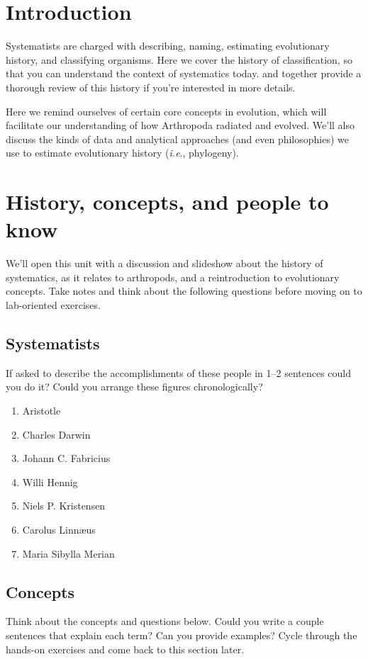 \section{Introduction}
Systematists are charged with describing, naming, estimating evolutionary history, and classifying organisms. Here we cover the history of classification, so that you can understand the context of systematics today. \cite{grimaldi2005evolution} and \cite{EngelKristensen2013} together provide a thorough review of this history if you're interested in more details.

Here we remind ourselves of certain core concepts in evolution, which will facilitate our understanding of how Arthropoda radiated and evolved. We'll also discuss the kinds of data and analytical approaches (and even philosophies) we use to estimate evolutionary history (\textit{i.e}., phylogeny).

\section{History, concepts, and people to know}
We'll open this unit with a discussion and slideshow about the history of systematics, as it relates to arthropods, and a reintroduction to evolutionary concepts. Take notes and think about the following questions before moving on to lab-oriented exercises.

\subsection{Systematists}
If asked to describe the accomplishments of these people in 1--2 sentences could you do it? Could you arrange these figures chronologically?

\begin{enumerate} 
\item{Aristotle} 
\item{Charles Darwin}  
\item {Johann C. Fabricius}
\item {Willi Hennig}
\item Niels P. Kristensen
\item{Carolus Linn\ae{us}}  
\item{Maria Sibylla Merian}  
\end{enumerate}

\subsection{Concepts}
Think about the concepts and questions below. Could you write a couple sentences that explain each term? Can you provide examples? Cycle through the hands-on exercises and come back to this section later. 

